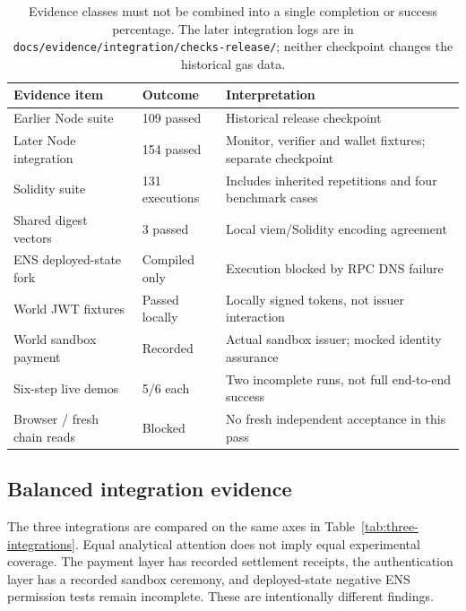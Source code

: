\documentclass[11pt]{article}
\newcommand{\code}[1]{\nolinkurl{#1}}
\begin{document}
\begin{table}[htbp]\centering\small
\begin{tabular}{p{.30\linewidth}p{.20\linewidth}p{.40\linewidth}}\toprule
Evidence item & Outcome & Interpretation\\\midrule
Earlier Node suite & 109 passed & Historical release checkpoint\\
Later Node integration & 154 passed & Monitor, verifier and wallet fixtures; separate checkpoint\\
Solidity suite & 131 executions & Includes inherited repetitions and four benchmark cases\\
Shared digest vectors & 3 passed & Local viem/Solidity encoding agreement\\
ENS deployed-state fork & Compiled only & Execution blocked by RPC DNS failure\\
World JWT fixtures & Passed locally & Locally signed tokens, not issuer interaction\\
World sandbox payment & Recorded & Actual sandbox issuer; mocked identity assurance\\
Six-step live demos & 5/6 each & Two incomplete runs, not full end-to-end success\\
Browser / fresh chain reads & Blocked & No fresh independent acceptance in this pass\\\bottomrule
\end{tabular}
\caption{Evidence classes must not be combined into a single completion or success percentage. The later integration logs are in \code{docs/evidence/integration/checks-release/}; neither checkpoint changes the historical gas data.}\label{tab:evidence}
\end{table}

\subsection{Balanced integration evidence}
The three integrations are compared on the same axes in Table~\ref{tab:three-integrations}. Equal analytical attention does not imply equal experimental coverage. The payment layer has recorded settlement receipts, the authentication layer has a recorded sandbox ceremony, and deployed-state negative ENS permission tests remain incomplete. These are intentionally different findings.
\end{document}
